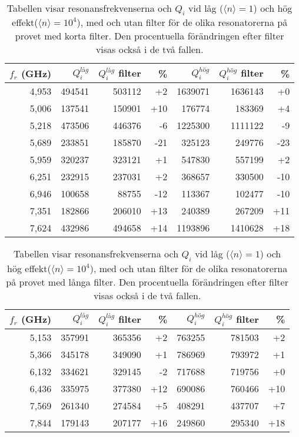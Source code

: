 \documentclass[main.tex]{subfiles}
\begin{document}
\begin{table}[h]
\centering
\caption{Tabellen visar resonansfrekvenserna och $Q_i$ vid låg ($\langle n\rangle=1$) och hög effekt($\langle n\rangle=10^4$), med och utan filter för de olika resonatorerna på provet med korta filter. Den procentuella förändringen efter filter visas också i de två fallen.}
\label{tab:Qi_A}
\begin{tabular}{rrrrrrr}
\toprule
$f_r$ (\unit{GHz}) & $Q_i^{låg}$ & $Q_i^{låg}$ filter &  \% & $Q_i^{hög}$ & $Q_i^{hög}$ filter &  \% \\
\midrule
4,953 & 494541 & 503112 & +2 & 1639071 & 1636143 & +0 \\
5,006 & 137541 & 150901 & +10 & 176774 & 183369 & +4 \\
5,218 & 473506 & 446376 & -6 & 1225300 & 1111122 & -9 \\
5,689 & 233851 & 185870 & -21 & 325123 & 249776 & -23 \\
5,959 & 320237 & 323121 & +1 & 547830 & 557199 & +2 \\
6,251 & 232915 & 237031 & +2 & 368657 & 330500 & -10 \\
6,946 & 100658 & 88755 & -12 & 113367 & 102477 & -10 \\
7,351 & 182866 & 206010 & +13 & 240389 & 267209 & +11 \\
7,624 & 432986 & 494658 & +14 & 1193896 & 1410628 & +18\\
\bottomrule
\end{tabular}
\end{table}

\begin{table}[h]
\centering
\caption{Tabellen visar resonansfrekvenserna och $Q_i$ vid låg ($\langle n\rangle=1$) och hög effekt($\langle n\rangle=10^4$), med och utan filter för de olika resonatorerna på provet med långa filter. Den procentuella förändringen efter filter visas också i de två fallen.}
\label{fig:Qi_C}
\begin{tabular}{rrrrrrr}
\toprule
$f_r$ (\unit{GHz}) & $Q_i^{låg}$ & $Q_i^{låg}$ filter &  \% & $Q_i^{hög}$ & $Q_i^{hög}$ filter & \% \\
\midrule
5,153 & 357991 & 365356 & +2 & 763255 & 781503 & +2 \\
5,366 & 345178 & 349090 & +1 & 786969 & 793972 & +1 \\
6,132 & 334621 & 329145 & -2 & 717688 & 719756 & +0 \\
6,436 & 335975 & 377380 & +12 & 690086 & 760466 & +10 \\
7,569 & 261340 & 274584 & +5 & 408291 & 437707 & +7 \\
7,844 & 179143 & 207177 & +16 & 249860 & 295340 & +18\\
\bottomrule
\end{tabular}
\end{table}
\end{document}
